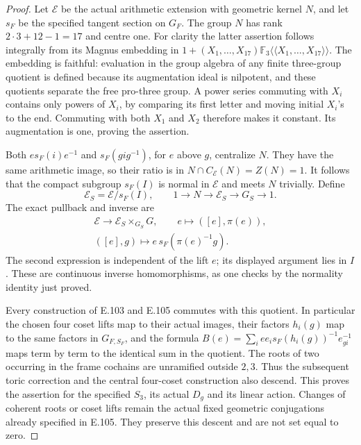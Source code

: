\begin{proof}
Let $\mathcal E$ be the actual arithmetic extension with
geometric kernel $N$, and let $s_F$ be the specified tangent
section on $G_F$.  The group $N$ has rank
$2\cdot3+12-1=17$ and centre one.
For clarity the latter assertion follows integrally from its
Magnus embedding in $1+(X_1,\ldots,X_{17})
\mathbb F_3\langle\!\langle X_1,\ldots,X_{17}\rangle\!\rangle$.
The embedding is faithful: evaluation in the group algebra
of any finite three-group quotient is defined because its
augmentation ideal is nilpotent, and these quotients separate
the free pro-three group.  A power series commuting with $X_i$
contains only powers of $X_i$, by comparing its first letter
and moving initial $X_i$'s to the end.  Commuting with both
$X_1$ and $X_2$ therefore makes it constant.  Its augmentation
is one, proving the assertion.

Both $e s_F(i)e^{-1}$ and $s_F(gig^{-1})$, for $e$ above $g$,
centralize $N$.  They have the same arithmetic image, so their
ratio is in $N\cap C_{\mathcal E}(N)=Z(N)=1$.
It follows that the compact subgroup $s_F(I)$ is normal in
$\mathcal E$ and meets $N$ trivially.  Define
\[
 \mathcal E_S=\mathcal E/s_F(I),\qquad
 1\longrightarrow N\longrightarrow\mathcal E_S
      \longrightarrow G_S\longrightarrow1.
 \tag{E117.9}
\]
The exact pullback and inverse are
\[
 \begin{gathered}
 \mathcal E\longrightarrow\mathcal E_S\times_{G_S}G,
          \qquad e\longmapsto([e],\pi(e)),\\
 ([e],g)\longmapsto e\,s_F(\pi(e)^{-1}g).
 \end{gathered}
 \tag{E117.10}
\]
The second expression is independent of the lift $e$;
its displayed argument lies in $I$.
These are continuous inverse homomorphisms, as one checks
by the normality identity just proved.

Every construction of E.103 and E.105 commutes with this
quotient.  In particular the chosen four coset lifts map to
their actual images, their factors $h_i(g)$ map to the same
factors in $G_{F,S_F}$, and the formula
$B(e)=\sum_i e e_i s_F(h_i(g))^{-1}e_{g i}^{-1}$ maps
term by term to the identical sum in the quotient.
The roots of two occurring in the frame cochains are
unramified outside $2,3$.  Thus the subsequent toric
correction and the central four-coset construction also
descend.  This proves the assertion for the specified
$S_3$, its actual $D_g$ and its linear action.
Changes of coherent roots or coset lifts remain the actual
fixed geometric conjugations already specified in E.105.
They preserve this descent and are not set equal to zero.


\end{proof}
